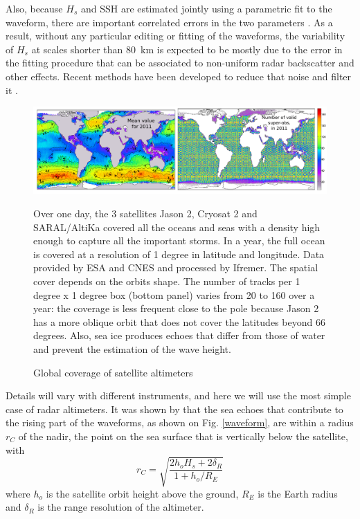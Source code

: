  Also, because $H_s$ and SSH are estimated jointly using a parametric fit to the waveform, there are important correlated errors in the two parameters \citep[e.g.][]{Dibarboure&al.2014,DeCarlo&al.2023}. 
 As a result, without any particular editing or fitting of the waveforms, the variability of $H_s$ at scales shorter than 80~km is 
 expected to be mostly due to the error in the fitting procedure that can be associated to non-uniform radar backscatter and other effects. Recent methods have been developed to reduce that noise and filter it \citep{Passaro&al.2015,Quilfen&Chapron2019}.
\begin{figure}[htb]
\centerline{\includegraphics[width=\textwidth]{FIGS_CH_SAT/altimetre_cartes2011.pdf}}
  \caption{Global coverage of satellite altimeters}
    {Over one day, the 3 satellites Jason 2, Cryosat 2 and SARAL/AltiKa covered all the oceans and seas with a density high enough to capture all the 
important storms. In a year, the full ocean is covered at a resolution of 1 degree in latitude and longitude.  
 Data provided by ESA and CNES and processed by Ifremer. The spatial 
cover depends on the orbits shape. The number of tracks per 1 degree x 1 degree box (bottom panel) varies
from 20 to 160 over a year: the coverage is less frequent close to the pole because Jason 2 has a more oblique orbit that does not cover the 
latitudes beyond 66 degrees. Also, sea ice  produces echoes that differ from those of water and prevent the estimation of the wave height.} 
\label{fig:altimeter_coverage}
\end{figure}

Details will vary with different instruments, and here we will use the most simple case of radar altimeters. It was shown by \cite{Chelton&al.1989} that the sea echoes that contribute to the rising part of the waveforms, as shown on Fig. \ref{waveform}, are within a radius $r_C$ of the nadir, the point on the sea surface that is vertically below the satellite, with 
\begin{equation}
    r_C =\sqrt{\frac{ 2 h_o H_s+ 2 \delta_R}{1+h_o/R_E}} \label{eq:rC}
\end{equation}
where $h_o$ is the satellite orbit height above the ground, $R_E$ is the Earth radius and $\delta_R$ is the range resolution of the altimeter.  

